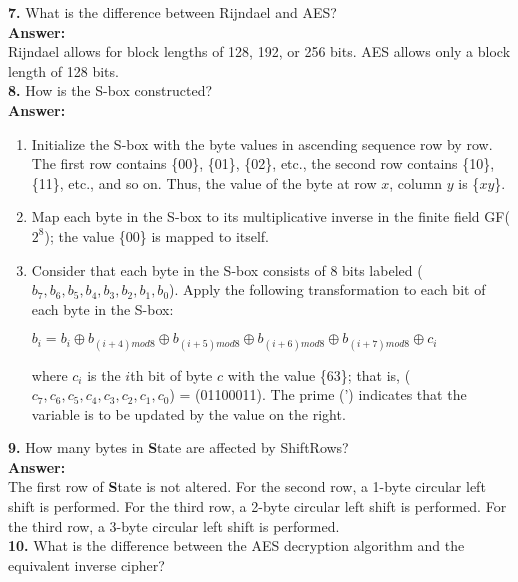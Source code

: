 \documentclass[paper=a4, fontsize=11pt]{scrartcl} %
\numberwithin{equation}{section} %
\numberwithin{figure}{section} %
\numberwithin{table}{section} %
\begin{document}
\textbf{7.} What is the difference between Rijndael and AES?\\

\textbf{Answer:}\\

Rijndael allows for block lengths of 128, 192, or 256 bits. AES allows only a block length of 128 bits.\\

\textbf{8.} How is the S-box constructed?\\

\textbf{Answer:}
\begin{enumerate}
\item Initialize the S-box with the byte values in ascending sequence row by row. The first row contains \{00\}, \{01\}, \{02\}, etc., the second row contains \{10\}, \{11\}, etc., and so on. Thus, the value of the byte at row $x$, column $y$ is \{$xy$\}.
\item Map each byte in the S-box to its multiplicative inverse in the finite field GF($2^{8}$); the value \{00\} is mapped to itself.
\item Consider that each byte in the S-box consists of 8 bits labeled ($b_{7}, b_{6}, b_{5}, b_{4}, b_{3}, b_{2}, b_{1}, b_{0}$). Apply the following transformation to each bit of each byte in the S-box:
\begin{center}
$b_{i}=b_{i}\oplus b_{(i+4)mod 8}\oplus b_{(i+5)mod 8}\oplus b_{(i+6)mod 8}\oplus b_{(i+7)mod 8}\oplus c_{i}$
\end{center}

where $c_{i}$ is the $i$th bit of byte $c$ with the value \{63\}; that is, ($c_{7}, c_{6}, c_{5}, c_{4}, c_{3}, c_{2}, c_{1}, c_{0}$) = (01100011). The prime (') indicates that the variable is to be updated by the value on the right.
\end{enumerate}


\textbf{9.} How many bytes in \textbf State are affected by ShiftRows?\\

\textbf{Answer:}\\

The first row of \textbf State is not altered. For the second row, a 1-byte circular left shift is performed. For the third row, a 2-byte circular left shift is performed. For the third row, a 3-byte circular left shift is performed.\\


\textbf{10.} What is the difference between the AES decryption algorithm and the equivalent inverse cipher?\\
\end{document}
